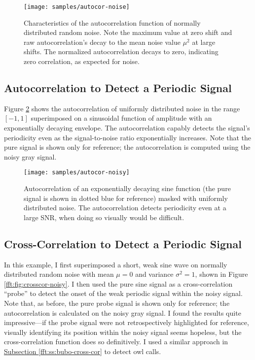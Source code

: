 \documentclass[11pt, a4paper]{article}
\begin{document}
\begin{figure}
\centering
\texttt{[image: samples/autocor-noise]}
\vspace{-7mm}
\caption{Characteristics of the autocorrelation function of normally distributed random noise. Note the maximum value at zero shift and raw autocorrelation's decay to the mean noise value $ \mu^{2} $ at large shifts. The normalized autocorrelation decays to zero, indicating zero correlation, as expected for noise.}
\label{fft:fig:noise}
\end{figure}



\subsection{Autocorrelation to Detect a Periodic Signal}
Figure \ref{fft:fig:autocor-noisy} shows the autocorrelation of uniformly distributed noise in the range $ [-1, 1] $ superimposed on a sinusoidal function of amplitude with an exponentially decaying envelope. The autocorrelation capably detects the signal's periodicity even as the signal-to-noise ratio exponentially increases. Note that the pure signal is shown only for reference; the autocorrelation is computed using the noisy gray signal.


\begin{figure}
\centering
\texttt{[image: samples/autocor-noisy]}
\vspace{-7mm}
\caption{Autocorrelation of an exponentially decaying sine function (the pure signal is shown in dotted blue for reference) masked with uniformly distributed noise. The autocorrelation detects periodicity even at a large SNR, when doing so visually would be difficult.}
\label{fft:fig:autocor-noisy}
\end{figure}



\subsection{Cross-Correlation to Detect a Periodic Signal}
In this example, I first superimposed a short, weak sine wave on normally distributed random noise with mean $ \mu = 0 $ and variance $ \sigma^{2} = 1 $, shown in Figure \ref{fft:fig:crosscor-noisy}. I then used the pure sine signal as a cross-correlation ``probe'' to detect the onset of the weak periodic signal within the noisy signal. Note that, as before, the pure probe signal is shown only for reference; the autocorrelation is calculated on the noisy gray signal. I found the results quite impressive---if the probe signal were not retrospectively highlighted for reference, visually identifying its position within the noisy signal seems hopeless, but the cross-correlation function does so definitively. I used a similar approach in \hyperref[fft:ss:bubo-cross-cor]{Subsection \ref{fft:ss:bubo-cross-cor}} to detect owl calls.
\end{document}
